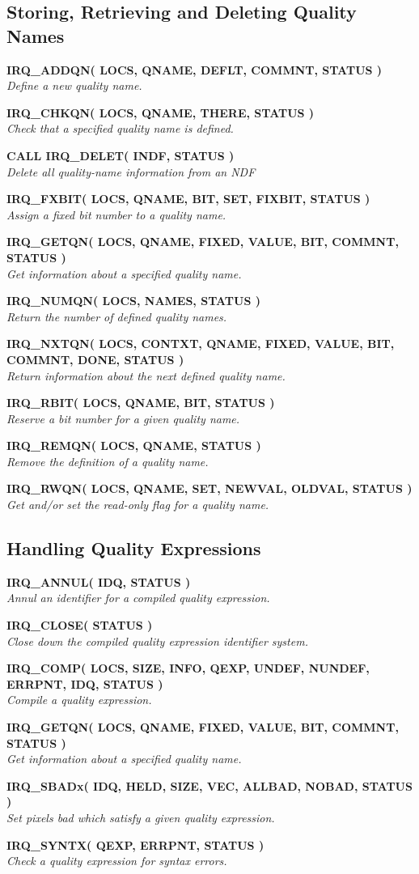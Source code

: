 \documentclass[twoside,11pt,nolof]{starlink}
\providecommand{\noteroutine}[2]{\textbf{#1}\hspace*{\fill}\nopagebreak \\
                             \hspace*{3em}\emph{#2}\hspace*{\fill}\par}
\begin{document}
\subsection{Storing, Retrieving and Deleting Quality Names}
\noteroutine{IRQ\_ADDQN( LOCS, QNAME, DEFLT, COMMNT, STATUS )}
   {Define a new quality name.}
\noteroutine{IRQ\_CHKQN( LOCS, QNAME, THERE, STATUS )}
   {Check that a specified quality name is defined.}
\noteroutine{CALL IRQ\_DELET( INDF, STATUS )}
   {Delete all quality-name information from an NDF}
\noteroutine{IRQ\_FXBIT( LOCS, QNAME, BIT, SET, FIXBIT, STATUS )}
   {Assign a fixed bit number to a quality name.}
\noteroutine{IRQ\_GETQN( LOCS, QNAME, FIXED, VALUE, BIT, COMMNT, STATUS )}
   {Get information about a specified quality name.}
\noteroutine{IRQ\_NUMQN( LOCS, NAMES, STATUS )}
   {Return the number of defined quality names.}
\noteroutine{IRQ\_NXTQN( LOCS, CONTXT, QNAME, FIXED, VALUE, BIT, COMMNT, DONE, STATUS )}
   {Return information about the next defined quality name.}
\noteroutine{IRQ\_RBIT( LOCS, QNAME, BIT, STATUS )}
   {Reserve a bit number for a given quality name.}
\noteroutine{IRQ\_REMQN( LOCS, QNAME, STATUS )}
   {Remove the definition of a quality name.}
\noteroutine{IRQ\_RWQN( LOCS, QNAME, SET, NEWVAL, OLDVAL, STATUS )}
   {Get and/or set the read-only flag for a quality name.}

\subsection{Handling Quality Expressions}
\noteroutine{IRQ\_ANNUL( IDQ, STATUS )}
   {Annul an identifier for a compiled quality expression.}
\noteroutine{IRQ\_CLOSE( STATUS )}
   {Close down the compiled quality expression identifier system.}
\noteroutine{IRQ\_COMP( LOCS, SIZE, INFO, QEXP, UNDEF, NUNDEF, ERRPNT, IDQ, STATUS )}
   {Compile a quality expression.}
\noteroutine{IRQ\_GETQN( LOCS, QNAME, FIXED, VALUE, BIT, COMMNT, STATUS )}
   {Get information about a specified quality name.}
\noteroutine{IRQ\_SBADx( IDQ, HELD, SIZE, VEC, ALLBAD, NOBAD, STATUS )}
   {Set pixels bad which satisfy a given quality expression.}
\noteroutine{IRQ\_SYNTX( QEXP, ERRPNT, STATUS )}
   {Check a quality expression for syntax errors.}
\end{document}
